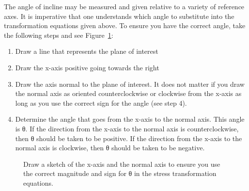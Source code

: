 \documentclass[
  letterpaper,
  DIV=11,
  numbers=noendperiod]{scrreprt}
\theoremstyle{definition}
\theoremstyle{remark}
\begin{document}
The angle of incline may be measured and given relative to a variety of
reference axes. It is imperative that one understands which angle to
substitute into the transformation equations given above. To ensure you
have the correct angle, take the following steps and see
Figure~\ref{fig-12.5}:

\begin{enumerate}
\def\labelenumi{\arabic{enumi}.}
\item
  Draw a line that represents the plane of interest
\item
  Draw the x-axis positive going towards the right
\item
  Draw the axis normal to the plane of interest. It does not matter if
  you draw the normal axis as oriented counterclockwise or clockwise
  from the x-axis as long as you use the correct sign for the angle (see
  step 4).
\item
  Determine the angle that goes from the x-axis to the normal axis. This
  angle is θ. If the direction from the x-axis to the normal axis is
  counterclockwise, then θ should be taken to be positive. If the
  direction from the x-axis to the normal axis is clockwise, then θ
  should be taken to be negative.
\end{enumerate}

\begin{figure}


\caption{\label{fig-12.5}Draw a sketch of the x-axis and the normal axis
to ensure you use the correct magnitude and sign for θ in the stress
transformation equations.}

\end{figure}%
\end{document}

